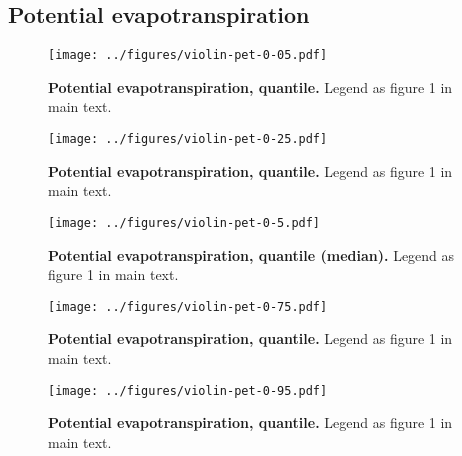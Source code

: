 \documentclass[12pt]{report}
\begin{document}
\subsection{Potential evapotranspiration}
\begin{figure}[h!]
  \begin{center}
    \texttt{[image: ../figures/violin-pet-0-05.pdf]}
  \end{center}
  \caption{\textbf{Potential evapotranspiration,  quantile.} Legend as
    figure 1 in main text.}
\end{figure}
\begin{figure}[h!]
  \begin{center}
    \texttt{[image: ../figures/violin-pet-0-25.pdf]}
  \end{center}
  \caption{\textbf{Potential evapotranspiration,  quantile.} Legend as
    figure 1 in main text.}
\end{figure}
\begin{figure}[h!]
  \begin{center}
    \texttt{[image: ../figures/violin-pet-0-5.pdf]}
  \end{center}
  \caption{\textbf{Potential evapotranspiration,  quantile (median).}
    Legend as figure 1 in main text.}
\end{figure}
\begin{figure}[h!]
  \begin{center}
    \texttt{[image: ../figures/violin-pet-0-75.pdf]}
  \end{center}
  \caption{\textbf{Potential evapotranspiration,  quantile.} Legend as
    figure 1 in main text.}
\end{figure}
\begin{figure}[h!]
  \begin{center}
    \texttt{[image: ../figures/violin-pet-0-95.pdf]}
  \end{center}
  \caption{\textbf{Potential evapotranspiration,  quantile.} Legend as
    figure 1 in main text.}
\end{figure}

\clearpage
\end{document}
